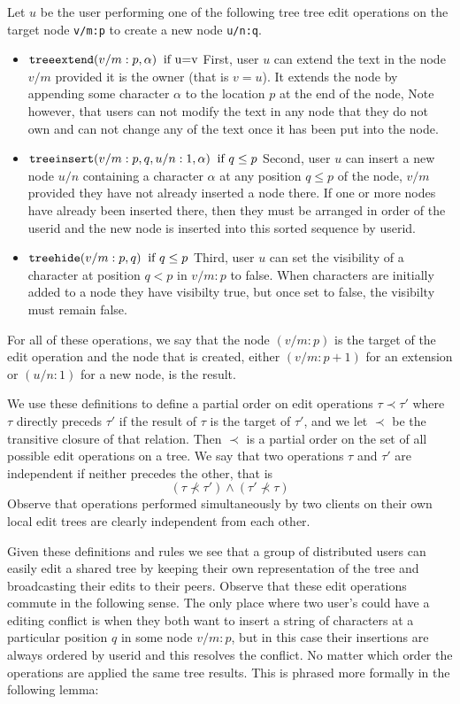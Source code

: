 \documentclass{amsart}
\begin{document}
Let $u$ be the user performing one of the following tree tree edit operations
on the target node {\tt v/m:p} to create a new node {\tt u/n:q}.
\begin{itemize}
\item ${\tt treeextend}(v/m:p,\alpha)\;\;\text{if u=v}$ \newline
First, user $u$ can extend the text in the node $v/m$
provided it is the owner (that is $v=u$). It extends the node by appending
some character $\alpha$ to the location $p$ at the end of the node,
Note however, that users can not modify
the text in any node that they do not own and can not change any of the text
once it has been put into the node.
\item ${\tt treeinsert}(v/m:p,q,u/n:1,\alpha) \;\; \text{if $q\le p$}$
\newline
Second, user $u$ can insert a new node $u/n$ containing a character $\alpha$
at any position $q\le p$ of the node, 
$v/m$ provided
they have not already inserted a node there. If one or more nodes have already been inserted there, then they must be arranged in order of the userid and the new node is inserted into this sorted sequence by userid.
\item ${\tt treehide}(v/m:p,q)  \;\; \text{if $q\le p$}$\newline
Third, user $u$ can set the visibility of a character at position $q < p$
in  $v/m:p$ to false.
When characters are initially added to a node they have visibilty true, but once
set to false, the visibilty must remain false. 
\end{itemize}
For all of these operations, we say that the node $(v/m:p)$ is the target of the edit operation and the node that is created, either $(v/m:p+1)$ for an extension or $(u/n:1)$ for a new node, is the result.  

We use these definitions to define a partial order on edit operations $\tau\prec\tau'$ where $\tau$ directly preceds $\tau'$ if the result of $\tau$ is the target of $\tau'$, and we let $\prec$ be the transitive closure of that relation.  Then $\prec$ is a partial order on the set of all possible edit operations on a tree. We say that two operations $\tau$ and $\tau'$ are independent if neither precedes the other, that is 
\[
\left (\tau\not\prec\tau'\right ) \wedge  \left ( \tau'\not\prec\tau \right )
\]
Observe that operations performed simultaneously by two clients on their own local edit trees are clearly independent from each other.

Given these definitions and rules we see that a group of distributed users can easily edit a 
shared tree by keeping their own representation of the tree and broadcasting
their edits to their peers. Observe that these edit operations commute in
the following sense. The only place where two user's could have a editing
conflict is when they both want to insert a string of characters at a particular
position $q$ in some node $v/m:p$, but in this case their insertions are always
ordered by userid and this resolves the conflict. No matter which order the
operations are applied the same tree results. This is phrased more formally
in the following lemma:
\end{document}
